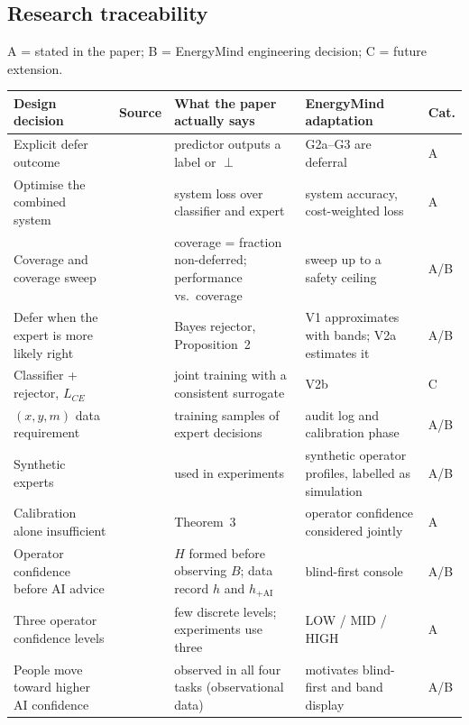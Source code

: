 \documentclass[11pt,a4paper]{article}
\renewcommand{\_}{\textunderscore\allowbreak}
\newcommand{\lvl}[1]{\textsf{#1}}
\begin{document}
\subsection{Research traceability}
A = stated in the paper; B = EnergyMind engineering decision; C = future extension.
\begin{table}[H]
\centering\footnotesize
\begin{tabularx}{\textwidth}{@{}>{\raggedright\arraybackslash}p{3.6cm}>{\raggedright\arraybackslash}p{1.0cm}LL>{\raggedright\arraybackslash}p{1.0cm}@{}}
\toprule
\textbf{Design decision} & \textbf{Source} & \textbf{What the paper actually says} & \textbf{EnergyMind adaptation} & \textbf{Cat.} \\
\midrule
Explicit defer outcome & \cite{mozannar} & predictor outputs a label or $\perp$ & \lvl{G2a}--\lvl{G3} are deferral & A \\
Optimise the combined system & \cite{mozannar} & system loss over classifier and expert & system accuracy, cost-weighted loss & A \\
Coverage and coverage sweep & \cite{mozannar} & coverage = fraction non-deferred; performance vs.\ coverage & sweep up to a safety ceiling & A/B \\
Defer when the expert is more likely right & \cite{mozannar} & Bayes rejector, Proposition~2 & V1 approximates with bands; V2a estimates it & A/B \\
Classifier + rejector, $L_{CE}$ & \cite{mozannar} & joint training with a consistent surrogate & V2b & C \\
$(x,y,m)$ data requirement & \cite{mozannar} & training samples of expert decisions & audit log and calibration phase & A/B \\
Synthetic experts & \cite{mozannar} & used in experiments & synthetic operator profiles, labelled as simulation & A/B \\
Calibration alone insufficient & \cite{benz} & Theorem~3 & operator confidence considered jointly & A \\
Operator confidence before AI advice & \cite{benz} & $H$ formed before observing $B$; data record $h$ and $h_{+\mathrm{AI}}$ & blind-first console & A/B \\
Three operator confidence levels & \cite{benz} & few discrete levels; experiments use three & LOW / MID / HIGH & A \\
People move toward higher AI confidence & \cite{benz} & observed in all four tasks (observational data) & motivates blind-first and band display & A/B \\

\end{tabularx}
\end{table}
\end{document}
